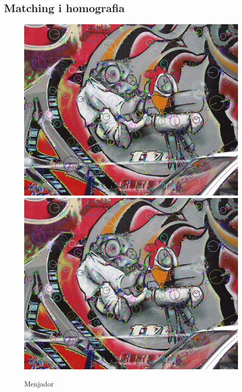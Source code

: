 \newpage
	\subsection{Matching i homografia}

		\begin{figure}[!htb]
				\includegraphics[width=\linewidth]{images/RobotKp}
				\label{fig:awesome_image1}
			\endminipage\hfill
				\includegraphics[width=\linewidth]{images/RobotKp}
				\label{fig:awesome_image2}
			\endminipage
			\caption{Menjador}
		\end{figure}

